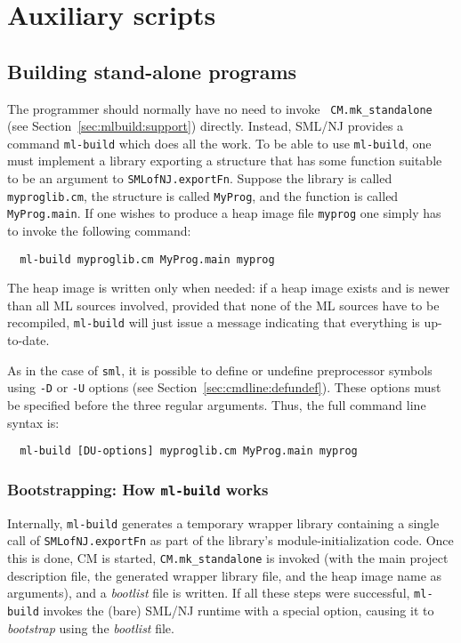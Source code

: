
\section{Auxiliary scripts}

\subsection{Building stand-alone programs}
\label{sec:mlbuild}

The programmer should normally have no need to invoke {\tt
CM.mk\_standalone} (see Section~\ref{sec:mlbuild:support}) directly.
Instead, SML/NJ provides a command {\tt ml-build} which does all the
work.  To be able to use {\tt ml-build}, one must implement a library
exporting a structure that has some function suitable to be an
argument to {\tt SMLofNJ.exportFn}.  Suppose the library is called
{\tt myproglib.cm}, the structure is called {\tt MyProg}, and the
function is called {\tt MyProg.main}.  If one wishes to produce a heap
image file {\tt myprog} one simply has to invoke the following
command:

\begin{verbatim}
  ml-build myproglib.cm MyProg.main myprog
\end{verbatim}

The heap image is written only when needed: if a heap image exists and
is newer than all ML sources involved, provided that none of the ML
sources have to be recompiled, {\tt ml-build} will just issue a
message indicating that everything is up-to-date.

As in the case of {\tt sml}, it is possible to define or undefine
preprocessor symbols using {\tt -D} or {\tt -U} options (see
Section~\ref{sec:cmdline:defundef}).  These options must be specified
before the three regular arguments.  Thus, the full command line
syntax is:

\begin{verbatim}
  ml-build [DU-options] myproglib.cm MyProg.main myprog
\end{verbatim}

\subsubsection{Bootstrapping: How {\tt ml-build} works}

Internally, {\tt ml-build} generates a temporary wrapper library
containing a single call of {\tt SMLofNJ.exportFn} as part of the
library's module-initialization code.  Once this is done, CM is
started, {\tt CM.mk\_standalone} is invoked (with the main project
description file, the generated wrapper library file, and the heap
image name as arguments), and a {\em bootlist} file is written.
If all these steps were successful, {\tt ml-build} invokes the (bare)
SML/NJ runtime with a special option, causing it to {\em bootstrap}
using the {\em bootlist} file.

